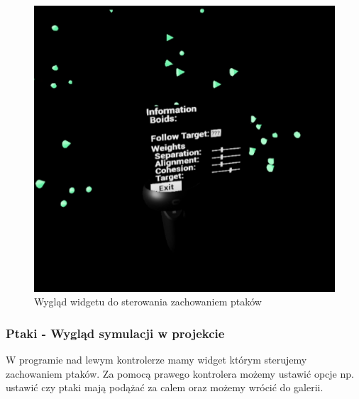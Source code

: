 \documentclass[a4paper,12pt,reqno]{article}
\begin{document}
\begin{figure}[H]%
\centering
\includegraphics[width=0.55\columnwidth]{graphics/boids/BP_BoidHud.png}
\caption{Wygląd widgetu do sterowania zachowaniem ptaków
\label{BPExample}}%
%
\qquad
\end{figure}  

\newpage
\subsubsection{Ptaki - Wygląd symulacji w projekcie}

W programie nad lewym kontrolerze mamy widget którym sterujemy zachowaniem ptaków. Za pomocą prawego kontrolera możemy ustawić opcje np. ustawić czy ptaki mają podążać za calem oraz możemy wrócić do galerii.

\end{document}
